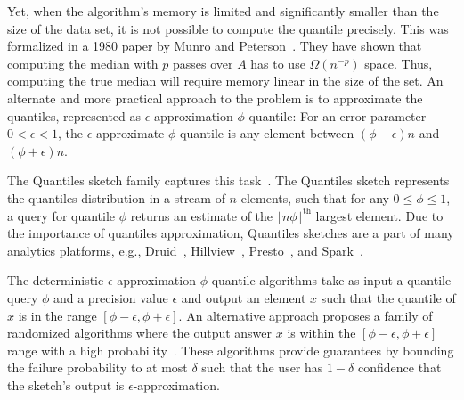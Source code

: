 Yet, when the algorithm's memory is limited and significantly smaller than the size of the data set, it is not possible to compute the quantile precisely. This was formalized in a 1980 paper by Munro and Peterson~\cite{MunroPeterson1980}. They have shown that computing the median with $p$ passes over $A$ has to use $\Omega(n^{-p})$ space. Thus, computing the true median will require memory linear in the size of the set. An alternate and more practical approach to the problem is to approximate the quantiles, represented as $\epsilon$ approximation $\phi$-quantile: For an error parameter $0<\epsilon<1$, the $\epsilon$-approximate $\phi$-quantile is any element between $(\phi-\epsilon)n$ and $(\phi+\epsilon)n$.


The Quantiles sketch family captures this task~\cite{masson2019ddsketch, mergeables_summaries, gan2018moment, cormode2021relative}. The Quantiles sketch represents the quantiles distribution in a stream of $n$ elements, such that for any $0 \leq \phi \leq 1$, a query for quantile $\phi$ returns an estimate of the $\lfloor n\phi \rfloor ^{\text{th}}$ largest element. Due to the importance of quantiles approximation, Quantiles sketches are a part of many analytics platforms, e.g., Druid~\cite{druid-quantiles}, Hillview~\cite{budiu2019hillview}, Presto~\cite{presto}, and Spark~\cite{spark}.


The deterministic $\epsilon$-approximation $\phi$-quantile algorithms take as input a quantile query $\phi$ and a precision value $\epsilon$ and output an element $x$ such that the quantile of $x$ is in the range $[\phi-\epsilon, \phi+\epsilon]$. An alternative approach proposes a family of randomized algorithms where the output answer $x$ is within the $[\phi-\epsilon, \phi+\epsilon]$ range with a high probability~\cite{MankuRajagoplanLindsay1999, KarninKevinLiberty2016}. These algorithms provide guarantees by bounding the failure probability to at most $\delta$ such that the user has $1-\delta$ confidence that the sketch’s output is $\epsilon$-approximation.


